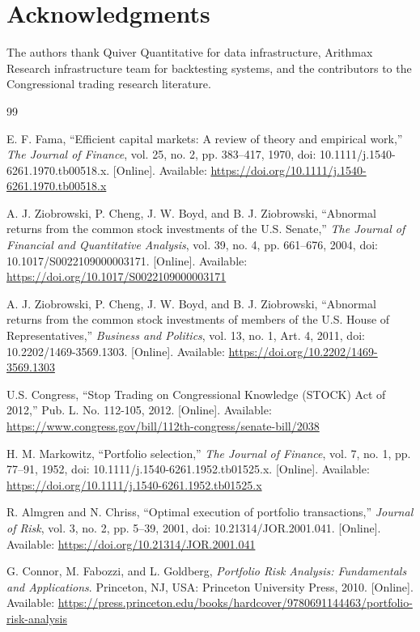 \documentclass[twocolumn,ieee]{Base_Latex_Template/arithmaxresearch}
\begin{document}
\section*{Acknowledgments}

The authors thank Quiver Quantitative for data infrastructure, Arithmax Research infrastructure team for backtesting systems, and the contributors to the Congressional trading research literature.


\begin{thebibliography}{99}

E. F. Fama, ``Efficient capital markets: A review of theory and empirical work,'' \emph{The Journal of Finance}, vol. 25, no. 2, pp. 383--417, 1970, doi: 10.1111/j.1540-6261.1970.tb00518.x. [Online]. Available: \url{https://doi.org/10.1111/j.1540-6261.1970.tb00518.x}

A. J. Ziobrowski, P. Cheng, J. W. Boyd, and B. J. Ziobrowski, ``Abnormal returns from the common stock investments of the U.S. Senate,'' \emph{The Journal of Financial and Quantitative Analysis}, vol. 39, no. 4, pp. 661--676, 2004, doi: 10.1017/S0022109000003171. [Online]. Available: \url{https://doi.org/10.1017/S0022109000003171}

A. J. Ziobrowski, P. Cheng, J. W. Boyd, and B. J. Ziobrowski, ``Abnormal returns from the common stock investments of members of the U.S. House of Representatives,'' \emph{Business and Politics}, vol. 13, no. 1, Art. 4, 2011, doi: 10.2202/1469-3569.1303. [Online]. Available: \url{https://doi.org/10.2202/1469-3569.1303}

U.S. Congress, ``Stop Trading on Congressional Knowledge (STOCK) Act of 2012,'' Pub. L. No. 112-105, 2012. [Online]. Available: \url{https://www.congress.gov/bill/112th-congress/senate-bill/2038}

H. M. Markowitz, ``Portfolio selection,'' \emph{The Journal of Finance}, vol. 7, no. 1, pp. 77--91, 1952, doi: 10.1111/j.1540-6261.1952.tb01525.x. [Online]. Available: \url{https://doi.org/10.1111/j.1540-6261.1952.tb01525.x}

R. Almgren and N. Chriss, ``Optimal execution of portfolio transactions,'' \emph{Journal of Risk}, vol. 3, no. 2, pp. 5--39, 2001, doi: 10.21314/JOR.2001.041. [Online]. Available: \url{https://doi.org/10.21314/JOR.2001.041}

G. Connor, M. Fabozzi, and L. Goldberg, \emph{Portfolio Risk Analysis: Fundamentals and Applications}. Princeton, NJ, USA: Princeton University Press, 2010. [Online]. Available: \url{https://press.princeton.edu/books/hardcover/9780691144463/portfolio-risk-analysis}

\end{thebibliography}
\end{document}
